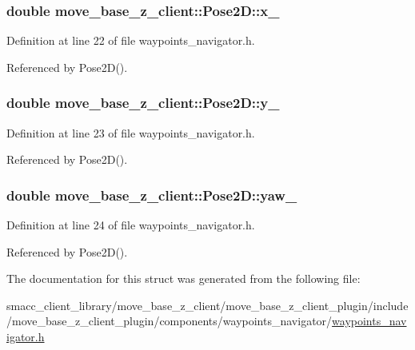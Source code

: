 \subsubsection[{\texorpdfstring{x\+\_\+}{x_}}]{\setlength{\rightskip}{0pt plus 5cm}double move\+\_\+base\+\_\+z\+\_\+client\+::\+Pose2\+D\+::x\+\_\+}\hypertarget{structmove__base__z__client_1_1Pose2D_a92b53110c2fdd77c18275d6e16709581}{}\label{structmove__base__z__client_1_1Pose2D_a92b53110c2fdd77c18275d6e16709581}


Definition at line 22 of file waypoints\+\_\+navigator.\+h.



Referenced by Pose2\+D().

\subsubsection[{\texorpdfstring{y\+\_\+}{y_}}]{\setlength{\rightskip}{0pt plus 5cm}double move\+\_\+base\+\_\+z\+\_\+client\+::\+Pose2\+D\+::y\+\_\+}\hypertarget{structmove__base__z__client_1_1Pose2D_a10e59f372c758bffb00bfaaca43ec1fc}{}\label{structmove__base__z__client_1_1Pose2D_a10e59f372c758bffb00bfaaca43ec1fc}


Definition at line 23 of file waypoints\+\_\+navigator.\+h.



Referenced by Pose2\+D().

\subsubsection[{\texorpdfstring{yaw\+\_\+}{yaw_}}]{\setlength{\rightskip}{0pt plus 5cm}double move\+\_\+base\+\_\+z\+\_\+client\+::\+Pose2\+D\+::yaw\+\_\+}\hypertarget{structmove__base__z__client_1_1Pose2D_a75fda2f20515d0acdb83d33017e6c97e}{}\label{structmove__base__z__client_1_1Pose2D_a75fda2f20515d0acdb83d33017e6c97e}


Definition at line 24 of file waypoints\+\_\+navigator.\+h.



Referenced by Pose2\+D().



The documentation for this struct was generated from the following file\+:\begin{DoxyCompactItemize}
\item 
smacc\+\_\+client\+\_\+library/move\+\_\+base\+\_\+z\+\_\+client/move\+\_\+base\+\_\+z\+\_\+client\+\_\+plugin/include/move\+\_\+base\+\_\+z\+\_\+client\+\_\+plugin/components/waypoints\+\_\+navigator/\hyperlink{waypoints__navigator_8h}{waypoints\+\_\+navigator.\+h}\end{DoxyCompactItemize}
